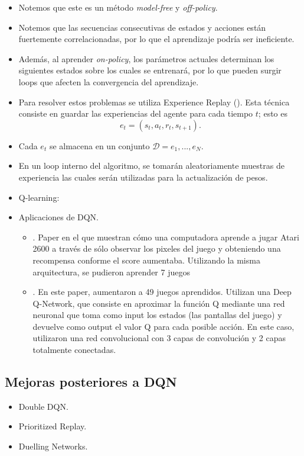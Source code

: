 \documentclass[11pt]{article}
\theoremstyle{plain}
\begin{document}
\begin{itemize}
	   \item Notemos que este es un método \textit{model-free} y \textit{off-policy}.
	   \item Notemos que las secuencias consecutivas de estados y acciones están fuertemente correlacionadas, por lo que el aprendizaje podría ser ineficiente.
	   \item Además, al aprender \textit{on-policy}, los parámetros actuales determinan los siguientes estados sobre los cuales se entrenará, por lo que pueden surgir loops que afecten la convergencia del aprendizaje. 
	   \item Para resolver estos problemas se utiliza Experience Replay (\cite{Lin1992}). Esta técnica consiste en guardar las experiencias del agente para cada tiempo $t$; esto es 
	   \[ e_t = (s_t, a_t, r_t, s_{t+1}). \]
	   \item Cada $e_t$ se almacena en un conjunto $\mathcal{D} = e_1 , ... , e_N$.
	   \item En un loop interno del algoritmo, se tomarán aleatoriamente muestras de experiencia las cuales serán utilizadas para la actualización de pesos. 
	   \item Q-learning:
	   \item Aplicaciones de DQN.
		\begin{itemize}
			\item \cite{mnih2013playing}. Paper en el que muestran cómo una computadora aprende a jugar Atari 2600 a través de sólo observar los pixeles del juego y obteniendo una 																		recompensa conforme el score aumentaba. Utilizando la misma arquitectura, se pudieron aprender 7 juegos
			\item \cite{mnih2015human}. En este paper, aumentaron a 49 juegos aprendidos. Utilizan una Deep Q-Network, que consiste en aproximar la función Q mediante una red 																			neuronal que toma como input los estados (las pantallas del juego) y devuelve como output el valor Q para cada posible acción. En este caso, 																			utilizaron una red convolucional con 3 capas de convolución y 2 capas totalmente conectadas.
	  \end{itemize}
	      	 \end{itemize}  	
\subsection{Mejoras posteriores a DQN}
   	   \begin{itemize}
   	   		\item Double DQN.
   	   		\item Prioritized Replay.
   	   		\item Duelling Networks.
   	   \end{itemize}
\end{document}
